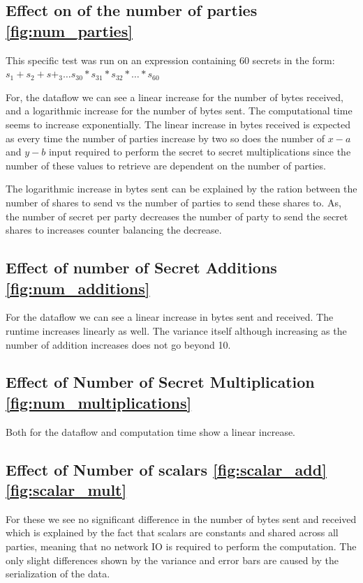 \documentclass[10pt,conference,compsocconf]{IEEEtran}
\begin{document}
\subsection{Effect on of the number of parties \ref{fig:num_parties}}
This specific test was run on an expression containing 60 secrets in the form: $s_1 + s_2 + s+_3 \dots s_{30} * s_{31} *
s_{32} * \dots*  s_{60}$

For, the dataflow we can see a linear increase for the number of bytes received, and a logarithmic increase for the
number of bytes sent.
The computational time seems to increase exponentially.
The linear increase in bytes received is expected as every time the number of parties increase by two so does the number
of $x-a$ and $y-b$ input required to perform the secret to secret multiplications since the number of these values to
retrieve are dependent on the number of parties.

The logarithmic increase in bytes sent can be explained by the ration between the number of shares to send vs the
number of parties to send these shares to.
As, the number of secret per party decreases the number of party to send the secret shares to increases counter balancing
the decrease.


\subsection{Effect of number of Secret Additions \ref{fig:num_additions}}

For the dataflow we can see a linear increase in bytes sent and received.
The runtime increases linearly as well.
The variance itself although increasing as the number of addition increases does not go beyond 10.

\subsection{Effect of Number of Secret Multiplication \ref{fig:num_multiplications}}
Both for the dataflow and computation time show a linear increase.

\subsection{Effect of Number of scalars \ref{fig:scalar_add}\ref{fig:scalar_mult}}
For these we see no significant difference in the number of bytes sent and received
which is explained by the fact that scalars are constants and shared across all parties, meaning that no network
IO is required to perform the computation.
The only slight differences shown by the variance and error bars are caused by the serialization of the data.
\end{document}
